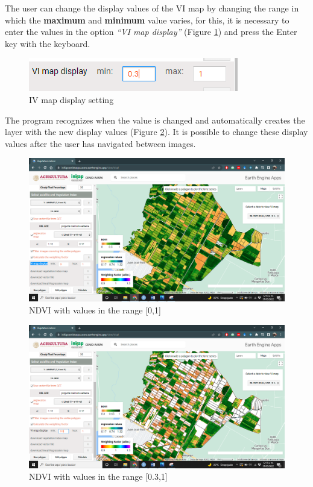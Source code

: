 \documentclass[
]{book}
\begin{document}
The user can change the display values of the VI map by changing the range in which the \textbf{maximum} and \textbf{minimum} value varies, for this, it is necessary to enter the values in the option \emph{``VI map display''} (Figure \ref{fig:figI7}) and press the Enter key with the keyboard.

\begin{figure}

{\centering \includegraphics{./images/Figure57} 

}

\caption{IV map display setting}\label{fig:figI7}
\end{figure}

The program recognizes when the value is changed and automatically creates the layer with the new display values (Figure \ref{fig:figI8}). It is possible to change these display values after the user has navigated between images.

\begin{figure}

{\centering \includegraphics[width=0.85\linewidth]{./images/Figure58} 

}

\caption{NDVI with values in the range [0,1]}\label{fig:figI8}
\end{figure}

\begin{figure}

{\centering \includegraphics[width=0.85\linewidth]{./images/Figure59} 

}

\caption{NDVI with values in the range [0.3,1]}\label{fig:figI9}
\end{figure}
\end{document}
